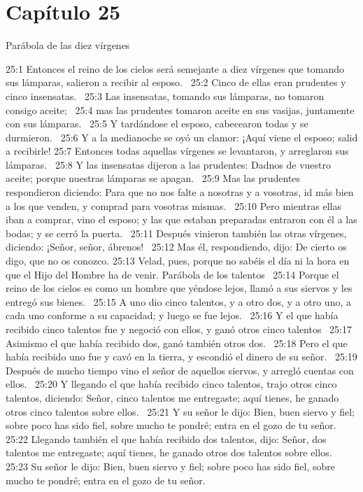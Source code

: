 \section*{Capítulo 25 }
Parábola de las diez vírgenes  

25:1 Entonces el reino de los cielos será semejante a diez vírgenes que tomando sus lámparas, salieron a recibir al esposo.  
25:2 Cinco de ellas eran prudentes y cinco insensatas.  
25:3 Las insensatas, tomando sus lámparas, no tomaron consigo aceite;  
25:4 mas las prudentes tomaron aceite en sus vasijas, juntamente con sus lámparas.  
25:5 Y tardándose el esposo, cabecearon todas y se durmieron.  
25:6 Y a la medianoche se oyó un clamor: ¡Aquí viene el esposo; salid a recibirle! 
25:7 Entonces todas aquellas vírgenes se levantaron, y arreglaron sus lámparas.  
25:8 Y las insensatas dijeron a las prudentes: Dadnos de vuestro aceite; porque nuestras lámparas se apagan.  
25:9 Mas las prudentes respondieron diciendo: Para que no nos falte a nosotras y a vosotras, id más bien a los que venden, y comprad para vosotras mismas.  
25:10 Pero mientras ellas iban a comprar, vino el esposo; y las que estaban preparadas entraron con él a las bodas; y se cerró la puerta.  
25:11 Después vinieron también las otras vírgenes, diciendo: ¡Señor, señor, ábrenos!  
25:12 Mas él, respondiendo, dijo: De cierto os digo, que no os conozco. 
25:13 Velad, pues, porque no sabéis el día ni la hora en que el Hijo del Hombre ha de venir. 
Parábola de los talentos  
25:14 Porque el reino de los cielos es como un hombre que yéndose lejos, llamó a sus siervos y les entregó sus bienes.  
25:15 A uno dio cinco talentos, y a otro dos, y a otro uno, a cada uno conforme a su capacidad; y luego se fue lejos.  
25:16 Y el que había recibido cinco talentos fue y negoció con ellos, y ganó otros cinco talentos  
25:17 Asimismo el que había recibido dos, ganó también otros dos.  
25:18 Pero el que había recibido uno fue y cavó en la tierra, y escondió el dinero de su señor.  
25:19 Después de mucho tiempo vino el señor de aquellos siervos, y arregló cuentas con ellos.  
25:20 Y llegando el que había recibido cinco talentos, trajo otros cinco talentos, diciendo: Señor, cinco talentos me entregaste; aquí tienes, he ganado otros cinco talentos sobre ellos.  
25:21 Y su señor le dijo: Bien, buen siervo y fiel; sobre poco has sido fiel, sobre mucho te pondré; entra en el gozo de tu señor.  
25:22 Llegando también el que había recibido dos talentos, dijo: Señor, dos talentos me entregaste; aquí tienes, he ganado otros dos talentos sobre ellos.  
25:23 Su señor le dijo: Bien, buen siervo y fiel; sobre poco has sido fiel, sobre mucho te pondré; entra en el gozo de tu señor.  
